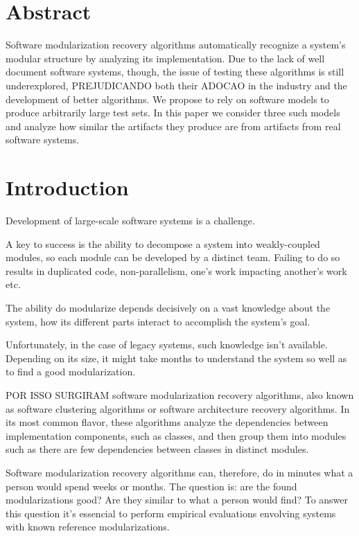 \section{Abstract}

Software modularization recovery algorithms automatically recognize a system's
modular structure by analyzing its implementation.
Due to the lack of well document software systems, though, the issue of testing
these algorithms is still underexplored, PREJUDICANDO both their ADOCAO in the
industry and the development of better algorithms.
We propose to rely on software models to produce arbitrarily large test sets. In
this paper we consider three such models and analyze how similar the artifacts
they produce are from artifacts from real software systems.

\section{Introduction}

Development of large-scale software systems is a challenge.

A key to success is the ability to decompose a system into weakly-coupled
modules, so each module can be developed by a distinct team. Failing to do so
results in duplicated code, non-parallelism, one's work impacting another's work
etc.

The ability do modularize depends decisively on a vast knowledge about the
system, how its different parts interact to accomplish the system's goal.

Unfortunately, in the case of legacy systems, such knowledge isn't available.
Depending on its size, it might take months to understand the system so well as
to find a good modularization.

POR ISSO SURGIRAM software modularization recovery algorithms, also known as
software clustering algorithms or software architecture recovery algorithms. In
its most common flavor, these algorithms analyze the dependencies between
implementation components, such as classes, and then group them into modules
such as there are few dependencies between classes in distinct modules.

Software modularization recovery algorithms can, therefore, do in minutes what a
person would spend weeks or months. The question is: are the found
modularizations good? Are they similar to what a person would find? To answer
this question it's essencial to perform empirical evaluations envolving systems
with known reference modularizations.

